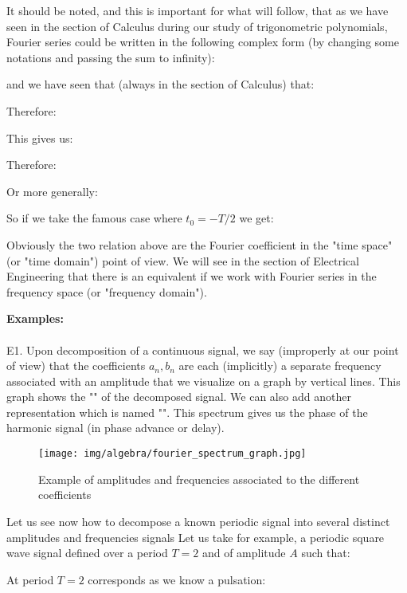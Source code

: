 	It should be noted, and this is important for what will follow, that as we have seen in the section of Calculus during our study of trigonometric polynomials, Fourier series could be written in the following complex form (by changing some notations and passing the sum to infinity):
	
	and we have seen that (always in the section of Calculus) that:
	
	Therefore:
	
	This gives us:
	
	Therefore:
	
	Or more generally:
	
	So if we take the famous case where $t_0=-T/2$ we get:
	
	Obviously the two relation above are the Fourier coefficient in the "time space" (or "time domain") point of view. We will see in the section of Electrical Engineering that there is an equivalent if we work with Fourier series in the frequency space (or "frequency domain").
	
	\begin{tcolorbox}[colframe=black,colback=white,sharp corners]
	\textbf{{\Large {}}Examples:}\\\\
	E1. Upon decomposition of a continuous signal, we say (improperly at our point of view) that the coefficients $a_n,b_n$ are each (implicitly) a separate frequency associated with an amplitude that we visualize on a graph by vertical lines. This graph shows the "" of the decomposed signal. We can also add another representation which is named "". This spectrum gives us the phase of the harmonic signal (in phase advance or delay).
	\begin{figure}[H]
		\centering
		\texttt{[image: img/algebra/fourier\_spectrum\_graph.jpg]}
		\caption{Example of amplitudes and frequencies associated to the different coefficients}
	\end{figure}
	Let us see now how to decompose a known periodic signal into several distinct amplitudes and frequencies signals
	Let us take for example, a periodic square wave signal defined over a period $T = 2$ and of amplitude $A$ such that:
	
	At period $T = 2$ corresponds as we know a pulsation:
	
	\end{tcolorbox}
	
